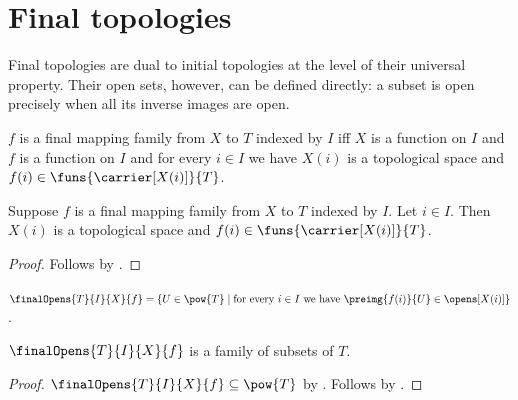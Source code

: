 \section{Final topologies}




Final topologies are dual to initial topologies at the level of their
universal property.  Their open sets, however, can be defined directly: a
subset is open precisely when all its inverse images are open.

\begin{definition}\label{final_topology_data}
    $f$ is a final mapping family from $X$ to $T$ indexed by $I$ iff
        $X$ is a function on $I$ and
        $f$ is a function on $I$ and
        for every $i\in I$ we have $X(i)$ is a topological space and
            $f(i)\in\funs{\carrier[X(i)]}{T}$.
\end{definition}

\begin{proposition}\label{final_topology_data_at}
    Suppose $f$ is a final mapping family from $X$ to $T$ indexed by $I$.
    Let $i\in I$.
    Then $X(i)$ is a topological space and
        $f(i)\in\funs{\carrier[X(i)]}{T}$.
\end{proposition}
\begin{proof}
    Follows by .
\end{proof}

\begin{definition}\label{final_opens}
    $\finalOpens{T}{I}{X}{f}
        =\{U\in\pow{T}\mid
            \text{for every $i\in I$ we have
                $\preimg{f(i)}{U}\in\opens[X(i)]$}\}$.
\end{definition}

\begin{proposition}\label{final_opens_type}
    $\finalOpens{T}{I}{X}{f}$ is a family of subsets of $T$.
\end{proposition}
\begin{proof}
    $\finalOpens{T}{I}{X}{f}\subseteq\pow{T}$ by
        .
    Follows by .
\end{proof}

